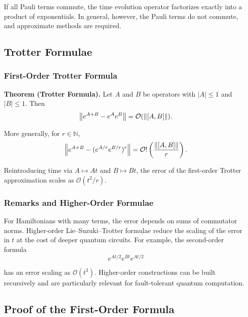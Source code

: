 \documentclass[11pt]{article}
\begin{document}
If all Pauli terms commute, the time evolution operator factorizes exactly into a product of exponentials. In general, however, the Pauli terms do not commute, and approximate methods are required.

\subsection{Trotter Formulae}


\subsubsection{First-Order Trotter Formula}

\textbf{Theorem (Trotter Formula).} Let $A$ and $B$ be operators with $|A| \le 1$ and $|B| \le 1$. Then
\begin{equation}
  \norm{e^{A+B} - e^A e^B} = \mathcal{O}(\norm{[A,B]}).
\end{equation}

More generally, for $r \in \mathbb{N}$,
\begin{equation}
  \norm{e^{A+B} - (e^{A/r}e^{B/r})^r} = \mathcal{O}!\left(\frac{\norm{[A,B]}}{r}\right).
\end{equation}

Reintroducing time via $A \mapsto At$ and $B \mapsto Bt$, the error of the first-order Trotter approximation scales as $\mathcal{O}(t^2/r)$.

\subsubsection{Remarks and Higher-Order Formulae}

For Hamiltonians with many terms, the error depends on sums of commutator norms. Higher-order Lie–Suzuki–Trotter formulae reduce the scaling of the error in $t$ at the cost of deeper quantum circuits. For example, the second-order formula
\begin{equation}
  e^{At/2} e^{Bt} e^{At/2}
\end{equation}

has an error scaling as $\mathcal{O}(t^3)$. Higher-order constructions can be built recursively and are particularly relevant for fault-tolerant quantum computation.

\subsection{Proof of the First-Order Formula}
\end{document}
